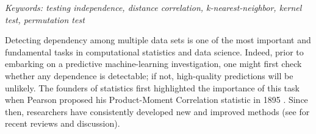 \documentclass[11pt]{article}
\begin{document}
\noindent%
{\it Keywords: testing independence, distance correlation, k-nearest-neighbor, kernel test, permutation test}

\setcounter{tocdepth}{2}%





{}



Detecting dependency among multiple data sets is one of the most important and fundamental tasks in computational statistics and data science.
Indeed, prior to embarking on a predictive machine-learning investigation, one might first check whether any dependence is detectable; if not, high-quality predictions will be unlikely.
The founders of statistics first highlighted the importance of this task when Pearson proposed his Product-Moment Correlation statistic in 1895 \cite{Pearson1895}.  Since then, researchers have consistently developed new and improved methods (see \cite{Reimherr2013,JosseHolmes2013} for  recent reviews and discussion).
\end{document}
